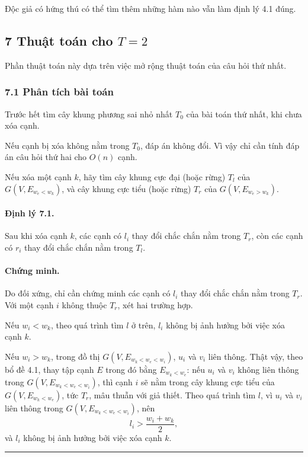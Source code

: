 \documentclass[11pt]{article}
\newcommand{\qedmark}{\hfill\rule{0.7ex}{0.7ex}}
\begin{document}
Độc giả có hứng thú có thể tìm thêm những hàm nào vẫn làm định lý 4.1 đúng.

\subsection*{\texorpdfstring{7 Thuật toán cho \(T=2\)}{7 Thuật toán cho T=2}}

Phần thuật toán này dựa trên việc mở rộng thuật toán của câu hỏi thứ nhất.

\subsubsection*{7.1 Phân tích bài toán}

Trước hết tìm cây khung phương sai nhỏ nhất \(T_0\) của bài toán thứ nhất, khi
chưa xóa cạnh.

Nếu cạnh bị xóa không nằm trong \(T_0\), đáp án không đổi. Vì vậy chỉ cần tính
đáp án câu hỏi thứ hai cho \(O(n)\) cạnh.

Nếu xóa một cạnh \(k\), hãy tìm cây khung cực đại (hoặc rừng) \(T_l\) của
\(G(V,E_{w_e<w_k})\), và cây khung cực tiểu (hoặc rừng) \(T_r\) của
\(G(V,E_{w_e>w_k})\).

\paragraph{Định lý 7.1.}
Sau khi xóa cạnh \(k\), các cạnh có \(l_i\) thay đổi chắc chắn nằm trong
\(T_r\), còn các cạnh có \(r_i\) thay đổi chắc chắn nằm trong \(T_l\).

\paragraph{Chứng minh.}
Do đối xứng, chỉ cần chứng minh các cạnh có \(l_i\) thay đổi chắc chắn nằm trong
\(T_r\). Với một cạnh \(i\) không thuộc \(T_r\), xét hai trường hợp.

Nếu \(w_i<w_k\), theo quá trình tìm \(l\) ở trên, \(l_i\) không bị ảnh hưởng bởi
việc xóa cạnh \(k\).

Nếu \(w_i>w_k\), trong đồ thị \(G(V,E_{w_k<w_e<w_i})\), \(u_i\) và \(v_i\) liên
thông. Thật vậy, theo bổ đề 4.1, thay tập cạnh \(E\) trong đó bằng
\(E_{w_k<w_e}\): nếu \(u_i\) và \(v_i\) không liên thông trong
\(G(V,E_{w_k<w_e<w_i})\), thì cạnh \(i\) sẽ nằm trong cây khung cực tiểu của
\(G(V,E_{w_k<w_e})\), tức \(T_r\), mâu thuẫn với giả thiết. Theo quá trình tìm
\(l\), vì \(u_i\) và \(v_i\) liên thông trong \(G(V,E_{w_k<w_e<w_i})\), nên
\[
  l_i>\frac{w_i+w_k}{2},
\]
và \(l_i\) không bị ảnh hưởng bởi việc xóa cạnh \(k\). \qedmark
\end{document}
